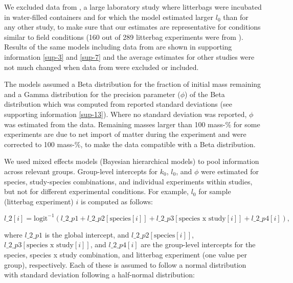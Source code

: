 \documentclass[bg, manuscript]{copernicus}
\begin{document}
We excluded data from \citet{Bengtsson.2017}, a large laboratory study where litterbags were incubated in water-filled containers and for which the model estimated larger \(l_0\) than for any other study, to make sure that our estimates are representative for conditions similar to field conditions (160 out of 289 litterbag experiments were from \citet{Bengtsson.2017}). Results of the same models including data from \citet{Bengtsson.2017} are shown in supporting information \ref{sup-3} and \ref{sup-7} and the average estimates for other studies were not much changed when data from \citet{Bengtsson.2017} were excluded or included.

The models assumed a Beta distribution for the fraction of initial mass remaining and a Gamma distribution for the precision parameter (\(\phi\)) of the Beta distribution which was computed from reported standard deviations (see supporting information \ref{sup-13}). Where no standard deviation was reported, \(\phi\) was estimated from the data. Remaining masses larger than 100 mass-\% for some experiments are due to net import of matter during the experiment and were corrected to 100 mass-\%, to make the data compatible with a Beta distribution.

We used mixed effects models (Bayesian hierarchical models) to pool information across relevant groups. Group-level intercepts for \(k_0\), \(l_0\), and \(\phi\) were estimated for species, study-species combinations, and individual experiments within studies, but not for different experimental conditions. For example, \(l_0\) for sample (litterbag experiment) \(i\) is computed as follows:

\begin{equation}
l\_2[i]  =  \text{logit}^{-1}(l\_2\_p1 + l\_2\_p2[\text{species}[i]] + l\_2\_p3[\text{species x study}[i]] + l\_2\_p4[i]),
\label{eq:leaching-hierarchical-model-l0}
\end{equation}

where \(l\_2\_p1\) is the global intercept, and \(l\_2\_p2[\text{species}[i]]\), \(l\_2\_p3[\text{species x study}[i]]\), and \(l\_2\_p4[i]\) are the group-level intercepts for the species, species x study combination, and litterbag experiment (one value per group), respectively. Each of these is assumed to follow a normal distribution with standard deviation following a half-normal distribution:
\end{document}
